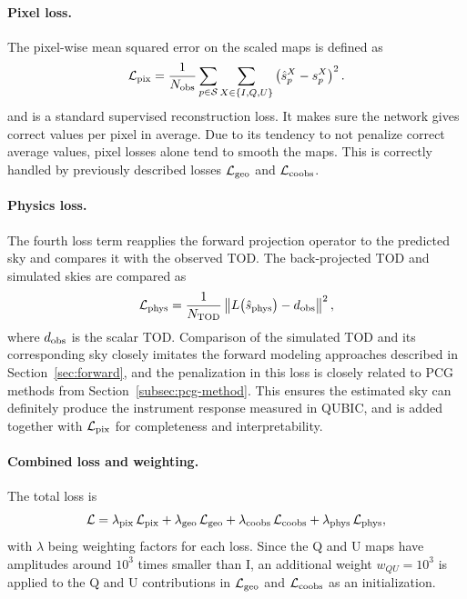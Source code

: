 \documentclass[a4paper,11pt]{article}
\begin{document}
\paragraph{Pixel loss.}
The pixel-wise mean squared error on the scaled maps is defined as
\begin{equation}
    \mathcal{L}_{\rm pix} = \frac{1}{N_{\rm obs}}
    \sum_{p \in \mathcal{S}} \sum_{X \in \{I,Q,U\}}
    \left(\hat{s}^X_p - s^X_p\right)^2.
    \label{eq:loss-pix}
\end{equation}
and is a standard supervised reconstruction loss. It makes sure the network gives correct values per pixel in average. Due to its tendency to not penalize correct average values, pixel losses alone tend to smooth the maps. This is correctly handled by previously described losses $\mathcal{L}_{\rm geo}$ and $\mathcal{L}_{\rm coobs}$.


\paragraph{Physics loss.}
The fourth loss term reapplies the forward projection operator to the predicted sky and compares it with the
observed TOD. The back-projected TOD and simulated skies are compared as
\begin{equation}
    \mathcal{L}_{\rm phys} = \frac{1}{N_{\rm TOD}}
    \left\| L\bigl(\hat{s}_{\rm phys}\bigr) - d_{\rm obs}
    \right\|^2,
    \label{eq:loss-phys}
\end{equation}
where $d_{\rm obs}$ is the scalar TOD. Comparison of the simulated TOD and its corresponding sky closely imitates the forward modeling approaches described in Section~\ref{sec:forward}, and the penalization in this loss is closely related to PCG methods from Section~\ref{subsec:pcg-method}. This ensures the estimated sky can definitely produce the instrument response measured in QUBIC, and is added together with $\mathcal{L}_{\rm pix}$ for completeness and interpretability. 

\paragraph{Combined loss and weighting.}
The total loss is
\begin{equation}
    \mathcal{L} = \lambda_{\rm pix}\,\mathcal{L}_{\rm pix}
    + \lambda_{\rm geo}\,\mathcal{L}_{\rm geo}
    + \lambda_{\rm coobs}\,\mathcal{L}_{\rm coobs} +  \lambda_{\rm phys}\,\mathcal{L}_{\rm phys},
    \label{eq:loss-total}
\end{equation}
with $\lambda$ being weighting factors for each loss. Since the Q and U maps have amplitudes
around $10^3$ times smaller than I, an additional weight $w_{QU} = 10^3$ is applied to the Q and U contributions in $\mathcal{L}_{\rm geo}$ and $\mathcal{L}_{\rm coobs}$ as an initialization.
\end{document}
